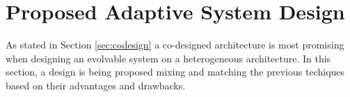 
\section{Proposed Adaptive System Design}
\label{sec:proposition}

As stated in Section \ref{sec:codesign} a co-designed architecture is most promising when designing an evolvable system on a heterogeneous architecture. In this section, a design is being proposed mixing and matching the previous techiques based on their advantages and drawbacks. 


